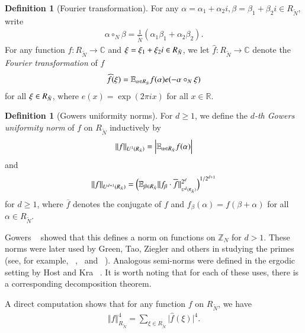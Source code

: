 \documentclass[12pt,amstex]{amsart}
\theoremstyle{definition}
\newtheorem{defn}[thm]{Definition}
\def \A {\alpha}
\def \B {\beta}
\def \R {R_{\tilde{N}}}
\def \x {\bold{\xi}}
\begin{document}
\begin{defn}[Fourier transformation]  For any $\A=\A_{1}+\A_{2}i,\B=\B_{1}+\B_{2}i\in\R$, write
  \begin{equation}\nonumber
  \begin{split}
   \A\circ_{N}\B=\frac{1}{\tilde{N}}(\A_{1}\B_{1}+\A_{2}\B_{2}).
  \end{split}
  \end{equation}
  For any function $f\colon \R\rightarrow\mathbb{C}$ and $\x=\xi_{1}+\xi_{2}i\in \R$, we let $\widehat{f}\colon\R\rightarrow\mathbb{C}$ denote the \emph{Fourier transformation} of $f$
  \begin{equation}\nonumber
  \begin{split}
   \widehat{f}(\x)=\mathbb{E}_{\A\in \R}f(\A)e(-\A\circ_{N}\x)
  \end{split}
  \end{equation}
for all $\x\in\R$, where $e(x)=\exp(2\pi ix)$ for all $x\in\mathbb{R}$.
\end{defn}

\begin{defn}[Gowers uniformity norms]
For $d\geq 1$, we define the \emph{$d$-th Gowers uniformity norm} of $f$ on $\R$ inductively by
  \begin{equation}\nonumber
    \begin{split}
      \Vert f\Vert_{U^{1}(\R)}=\Bigl\vert\mathbb{E}_{\A\in \R}f(\A)\Bigr\vert
    \end{split}
  \end{equation}
and
  \begin{equation}\nonumber
    \begin{split}
      \Vert f\Vert_{U^{d+1}(\R)}=\Bigl(\mathbb{E}_{\B\in \R}\Vert f_{\B}\cdot\overline{f}\Vert_{_{U^{d}(\R)}}^{2^{d}}\Bigr)^{1/2^{d+1}}
    \end{split}
  \end{equation}
for $d\geq 1$, where $\overline{f}$ denotes the conjugate of $f$ and $f_{\B}(\A)=f(\B+\A)$ for all $\A\in\R$.
\end{defn}
Gowers ~\cite{G} showed that this defines a norm on functions on $\mathbb{Z}_{N}$ for $d>1$. These norms were later used by Green, Tao, Ziegler and others in studying the primes (see, for example, ~\cite{5},~\cite{65} and ~\cite{6}). Analogous semi-norms were defined in the ergodic setting by Host and Kra ~\cite{HK}. It is worth noting that for each of these uses, there is a corresponding decomposition theorem.

A direct computation shows that for any function $f$ on $\R$, we have
\begin{equation}\label{F}
    \begin{split}
      \Vert f\Vert_{\R}^{4}=\sum_{\xi\in \R}\vert\widehat{f}(\xi)\vert^{4}.
    \end{split}
  \end{equation}
\end{document}
